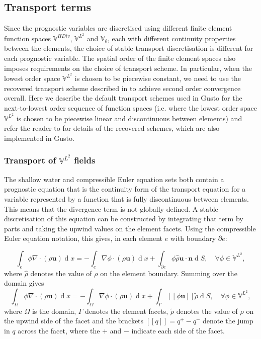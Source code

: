 \documentclass[journal abbreviation, manuscript]{copernicus}
\def\MM#1{\boldsymbol{#1}}
\DeclareMathOperator{\diff}{d}
\newcommand{\jump}[1]{[\![#1]\!]}
\begin{document}
\subsection{Transport terms}
\label{sec: transport}
Since the prognostic variables are discretised using different finite
element function spaces $\mathbb{V}^{HDiv}$, $\mathbb{V}^{L^2}$ and
$\mathbb{V}_\theta$, each with different continuity properties between
the elements, the choice of stable transport discretisation is
different for each prognostic variable. The spatial order of the
finite element spaces also imposes requirements on the choice of
transport scheme. In particular, when the lowest order space
$\mathbb{V}^{L^2}$ is chosen to be piecewise constant, we need to use
the recovered transport scheme described in
\citet{bendall2019recovered} to achieve second order convergence
overall. Here we describe the default transport schemes used in Gusto
for the next-to-lowest order sequence of function spaces (i.e. where
the lowest order space $\mathbb{V}^{L^2}$ is chosen to be piecewise
linear and discontinuous between elements) and refer the reader to
\citet{bendall2019recovered} for details of the recovered schemes,
which are also implemented in Gusto.

\subsubsection{Transport of $\mathbb{V}^{L^2}$ fields}
\label{subsec: DG transport}
The shallow water and compressible Euler equation sets both contain a
prognostic equation that is the continuity form of the transport
equation for a variable represented by a function that is fully
discontinuous between elements. This means that the divergence term is
not globally defined. A stable discretisation of this equation can be
constructed by integrating that term by parts and taking the upwind
values on the element facets. Using the compressible Euler equation
notation, this gives, in each element $e$ with boundary $\partial e$:

\begin{equation}
  \int_e \phi\nabla\cdot(\rho\MM{u}) \diff x = -\int_e \nabla\phi \cdot (\rho\MM{u}) \diff x + \int_{\partial e} \phi\hat{\rho}\MM{u}\cdot\MM{n} \diff S, \quad \forall \phi \in \mathbb{V}^{L^2},
\end{equation}
where $\hat{\rho}$ denotes the value of $\rho$ on the element
boundary. Summing over the domain gives
\begin{equation}
  \int_\Omega \phi\nabla\cdot(\rho\MM{u}) \diff x = -\int_\Omega \nabla\phi \cdot (\rho\MM{u}) \diff x + \int_\Gamma \jump{\phi\MM{u}}\tilde{\rho} \diff S, \quad \forall \phi \in \mathbb{V}^{L^2},
\end{equation}
where $\Omega$ is the domain, $\Gamma$ denotes the element facets,
$\tilde{\rho}$ denotes the value of $\rho$ on the upwind side of the
facet and the brackets $\jump{q} = q^+-q^-$ denote the jump in $q$
across the facet, where the $+$ and $-$ indicate each side of the
facet.
\end{document}
